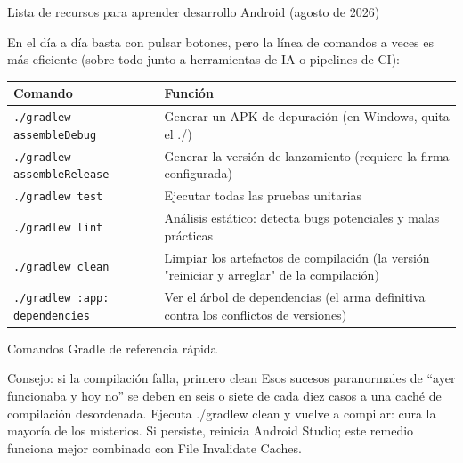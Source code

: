 \begin{center}\small\color{gray}Lista de recursos para aprender desarrollo Android (agosto de 2026)\end{center}


En el día a día basta con pulsar botones, pero la línea de comandos a veces es más eficiente (sobre todo junto a herramientas de IA o pipelines de CI):

\begin{center}
\begin{tabularx}{\linewidth}{|X|X|}
\hline
\textbf{Comando} & \textbf{Función} \tabularnewline
\hline
\texttt{.\allowbreak /\allowbreak gradlew assembleDebug} & Generar un APK de depuración (en Windows, quita el ./) \tabularnewline
\texttt{.\allowbreak /\allowbreak gradlew assembleRelease} & Generar la versión de lanzamiento (requiere la firma configurada) \tabularnewline
\texttt{.\allowbreak /\allowbreak gradlew test} & Ejecutar todas las pruebas unitarias \tabularnewline
\texttt{.\allowbreak /\allowbreak gradlew lint} & Análisis estático: detecta bugs potenciales y malas prácticas \tabularnewline
\texttt{.\allowbreak /\allowbreak gradlew clean} & Limpiar los artefactos de compilación (la versión "reiniciar y arreglar" de la compilación) \tabularnewline
\texttt{.\allowbreak /\allowbreak gradlew :app: dependencies} & Ver el árbol de dependencias (el arma definitiva contra los conflictos de versiones) \tabularnewline
\hline
\end{tabularx}
\end{center}

\begin{center}\small\color{gray}Comandos Gradle de referencia rápida\end{center}

\begin{tcbinfo}{Consejo: si la compilación falla, primero clean}
Esos sucesos paranormales de “ayer funcionaba y hoy no” se deben en seis o siete de cada diez casos a una caché de compilación desordenada. Ejecuta ./gradlew clean y vuelve a compilar: cura la mayoría de los misterios. Si persiste, reinicia Android Studio; este remedio funciona mejor combinado con File Invalidate Caches.

\end{tcbinfo}



